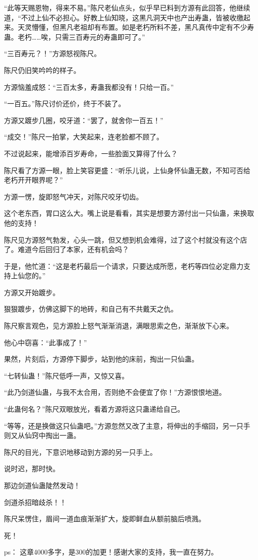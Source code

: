 \begin{this_body}
“此等天赐恩物，得来不易。”陈尺老仙点头，似乎早已料到方源有此回答，他继续道，“不过上仙不必担心。好教上仙知晓，这黑凡洞天中也产出寿蛊，皆被收缴起来。天灵懵懂，但黑凡老祖却有布置。如是老朽所料不差，黑凡真传中定有不少寿蛊。老朽……唉，只需三百寿元的寿蛊即可了。”

“三百寿元？！”方源怒视陈尺。

陈尺仍旧笑吟吟的样子。

方源恼羞成怒：“三百太多，寿蛊我都没有！只给一百。”

“一百五。”陈尺讨价还价，终于不装了。

方源又踱步几圈，咬牙道：“罢了，就舍你一百五！”

“成交！”陈尺一拍掌，大笑起来，连老脸都不顾了。

不过说起来，能增添百岁寿命，一些脸面又算得了什么？

陈尺看了方源一眼，脸上笑容更盛：“听乐儿说，上仙身怀仙蛊无数，不知可否给老朽开开眼界呢？”

方源一愣，旋即怒气冲天，对陈尺咬牙切齿。

这个老东西，胃口这么大。嘴上说是看看，其实是想要方源付出一只仙蛊，来换取他的支持！

陈尺见方源怒气勃发，心头一跳，但又想到机会难得，过了这个村就没有这个店了。难道今后回归了本家，还有机会吗？

于是，他忙道：“这是老朽最后一个请求，只要达成所愿，老朽等四位必定鼎力支持上仙您的。”

方源又开始踱步。

狠狠踱步，仿佛这脚下的地砖，和自己有不共戴天之仇。

陈尺察言观色，见方源脸上怒气渐渐消退，满眼思索之色，渐渐放下心来。

他心中窃喜：“此事成了！”

果然，片刻后，方源停下脚步，站到他的床前，掏出一只仙蛊。

“七转仙蛊！”陈尺低呼一声，又惊又喜。

“此乃剑道仙蛊，与我不太合用，否则绝不会便宜了你！”方源恨恨地道。

“此蛊何名？”陈尺双眼放光，看着方源将这只蛊递给自己。

“等等，还是换做这只仙蛊吧。”方源忽然又改了主意，将伸出的手缩回，另一只手则又从仙窍中掏出一蛊。

陈尺的目光，下意识地移动到方源的另一只手上。

说时迟，那时快。

那边剑道仙蛊陡然发动！

剑道杀招暗歧杀！！

陈尺呆愣住，眉间一道血痕渐渐扩大，旋即鲜血从额前脑后喷溅。

死！

ps：    这章4000多字，是300的加更！感谢大家的支持，我一直在努力。

\end{this_body}


